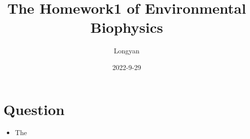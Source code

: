 \documentclass[12pt]{article}
\title{The Homework1 of Environmental Biophysics}
\author{Longyan}
\date{2022-9-29}
\begin{document}
\maketitle
\section{Question}
\begin{itemize}
    \item The
\end{itemize}
\end{document}
